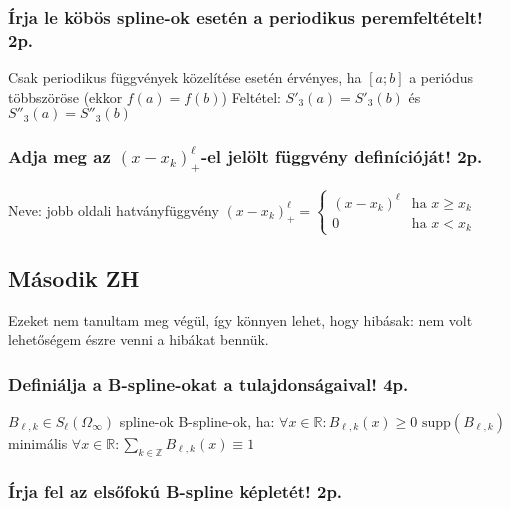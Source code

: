 \documentclass[12pt,a4paper]{article}
\begin{document}
\subsubsection{Írja le köbös spline-ok esetén a periodikus peremfeltételt! 2p.}

\begin{outline}
	\1 Csak periodikus függvények közelítése esetén érvényes,
	ha $[a;b]$ a periódus többszöröse (ekkor $f(a)=f(b)$)
	\1 Feltétel: $S'_3(a) = S'_3(b)$ és $S''_3(a) = S''_3(b)$
\end{outline}

\subsubsection{Adja meg az $(x-x_k)^\ell_+$-el jelölt függvény definícióját! 2p.}

\begin{outline}
	\1 Neve: jobb oldali hatványfüggvény
	\1 $(x-x_k)^\ell_+ = \begin{cases}
		(x-x_k)^\ell & \text{ha } x \ge x_k \\
		0 & \text{ha } x < x_k
	\end{cases}$
\end{outline}

\pagebreak

\subsection{Második ZH}

\begin{outline}
	\1 Ezeket nem tanultam meg végül, így könnyen lehet, hogy hibásak: nem volt lehetőségem észre venni a hibákat bennük.
\end{outline}

\subsubsection{Definiálja a B-spline-okat a tulajdonságaival! 4p.}

\begin{outline}
	\1 $B_{\ell,k} \in S_\ell(\Omega_\infty)$ spline-ok B-spline-ok, ha:
		\2 $\forall x \in \mathbb{R}: B_{\ell,k}(x) \ge 0$
		\2 $\text{supp}(B_{\ell,k})$ minimális
		\2 $\forall x \in \mathbb{R}: \sum_{k \in \mathbb{Z}} B_{\ell,k}(x) \equiv 1$
\end{outline}

\subsubsection{Írja fel az elsőfokú B-spline képletét! 2p.}
\end{document}

